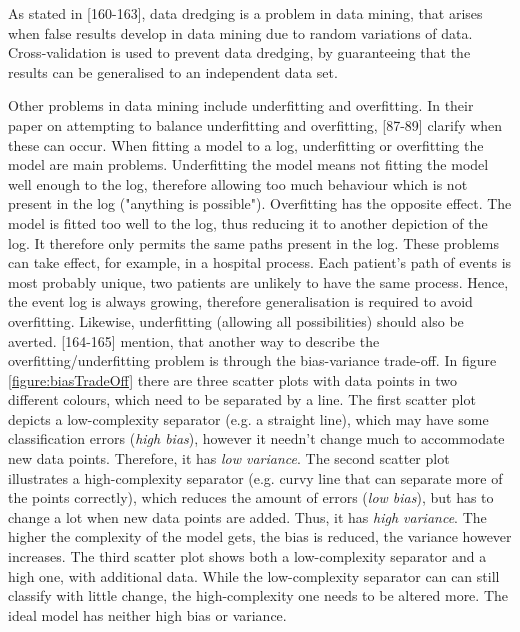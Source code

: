 As stated in \textcite{DataMiningAndPredictiveAnalytics}[160-163], data dredging is a problem in data mining, that arises when false results develop in data mining due to random variations of data. Cross-validation is used to prevent data dredging, by guaranteeing that the results can be generalised to an independent data set. 

Other problems in data mining include underfitting and overfitting. In their paper on attempting to balance underfitting and overfitting, \textcite{van2010process}[87-89] clarify when these can occur. When fitting a model to a log, underfitting or overfitting the model are main problems. Underfitting the model means not fitting the model well enough to the log, therefore allowing too much behaviour which is not present in the log ("anything is possible"). Overfitting has the opposite effect. The model is fitted too well to the log, thus reducing it to another depiction of the log. It therefore only permits the same paths present in the log. These problems can take effect, for example, in a hospital process. Each patient's path of events is most probably unique, two patients are unlikely to have the same process. Hence, the event log is always growing, therefore generalisation is required to avoid overfitting. Likewise, underfitting (allowing all possibilities) should also be averted. 
\textcite{DataMiningAndPredictiveAnalytics}[164-165] mention, that another way to describe the overfitting/underfitting problem is through the bias-variance trade-off. In figure \ref{figure:biasTradeOff} there are three scatter plots with data points in two different colours, which need to be separated by a line. The first scatter plot depicts a low-complexity separator (e.g. a straight line), which may have some classification errors (\textit{high bias}), however it needn't change much to accommodate new data points. Therefore, it has \textit{low variance}. The second scatter plot illustrates a high-complexity separator (e.g. curvy line that can separate more of the points correctly), which reduces the amount of errors (\textit{low bias}), but has to change a lot when new data points are added. Thus, it has \textit{high variance}. The higher the complexity of the model gets, the bias is reduced, the variance however increases. The third scatter plot shows both a low-complexity separator and a high one, with additional data. While the low-complexity separator can can still classify with little change, the high-complexity one needs to be altered more. The ideal model has neither high bias or variance.

